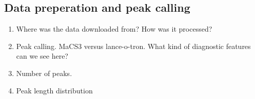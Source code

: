 \subsection{Data preperation and peak calling}

\begin{enumerate}
    \item Where was the data downloaded from? How was it processed?
    \item Peak calling. MaCS3 versus lance-o-tron. What kind of diagnostic features can we see here? 
    \item Number of peaks. 
    \item Peak length distribution
\end{enumerate}
